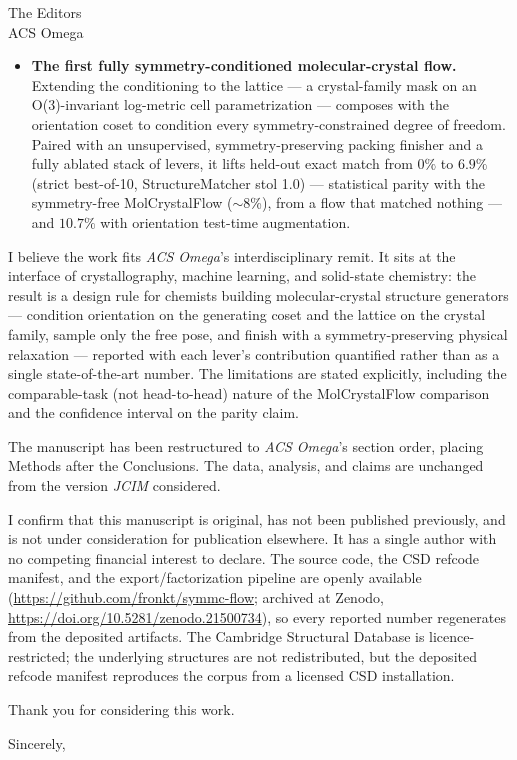 \documentclass[11pt]{letter}
\begin{document}
\begin{letter}{The Editors\\ACS Omega}
\begin{itemize}
\item \textbf{The first fully symmetry-conditioned molecular-crystal flow.}
Extending the conditioning to the lattice --- a crystal-family mask on an
O(3)-invariant log-metric cell parametrization --- composes with the orientation
coset to condition every symmetry-constrained degree of freedom. Paired with an
unsupervised, symmetry-preserving packing finisher and a fully ablated stack of
levers, it lifts held-out exact match from $0\%$ to $6.9\%$ (strict best-of-10,
StructureMatcher stol 1.0) --- statistical parity with the symmetry-free
MolCrystalFlow ($\sim$8\%), from a flow that matched nothing --- and $10.7\%$ with
orientation test-time augmentation.
\end{itemize}

I believe the work fits \textit{ACS Omega}'s interdisciplinary remit. It sits at
the interface of crystallography, machine learning, and solid-state chemistry: the
result is a design rule for chemists building molecular-crystal structure
generators --- condition orientation on the generating coset and the lattice on the
crystal family, sample only the free pose, and finish with a symmetry-preserving
physical relaxation --- reported with each lever's contribution quantified rather
than as a single state-of-the-art number. The limitations are stated explicitly,
including the comparable-task (not head-to-head) nature of the MolCrystalFlow
comparison and the confidence interval on the parity claim.

The manuscript has been restructured to \textit{ACS Omega}'s section order, placing
Methods after the Conclusions. The data, analysis, and claims are unchanged from
the version \textit{JCIM} considered.

I confirm that this manuscript is original, has not been published previously, and
is not under consideration for publication elsewhere. It has a single author with
no competing financial interest to declare. The source code, the CSD refcode
manifest, and the export/factorization pipeline are openly available
(\url{https://github.com/fronkt/symmc-flow}; archived at Zenodo,
\url{https://doi.org/10.5281/zenodo.21500734}), so every reported number
regenerates from the deposited artifacts. The Cambridge Structural Database is
licence-restricted; the underlying structures are not redistributed, but the
deposited refcode manifest reproduces the corpus from a licensed CSD installation.

Thank you for considering this work.

\closing{Sincerely,}

\end{letter}
\end{document}
